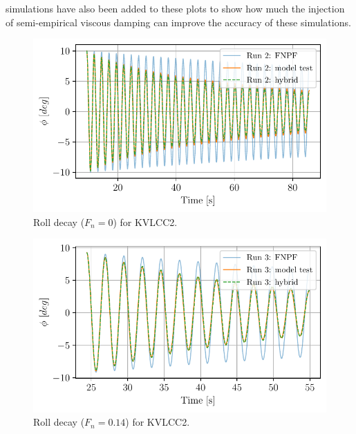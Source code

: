 simulations have also been added to these plots to show how much the injection of semi-empirical viscous damping can improve the accuracy of these simulations.
\begin{figure}[h]
\center
\includegraphics[width=\textwidth]{figures/hybrid_0_time.pdf}
\caption{Roll decay ($F_n=0$) for KVLCC2.}
\label{fig:hybrid_0_time}
\end{figure}
\begin{figure}[h]
\center
\includegraphics[width=\textwidth]{figures/hybrid_speed_time.pdf}
\caption{Roll decay ($F_n=0.14$) for KVLCC2.}
\label{fig:hybrid_speed_time}
\end{figure}
\clearpage